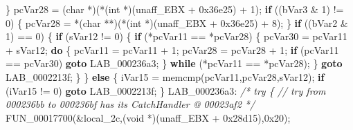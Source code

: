 \documentclass[
]{article}
\newenvironment{Shaded}{}{}
\newcommand{\BaseNTok}[1]{\textcolor[rgb]{0.25,0.63,0.44}{#1}}
\newcommand{\CommentTok}[1]{\textcolor[rgb]{0.38,0.63,0.69}{\textit{#1}}}
\newcommand{\ControlFlowTok}[1]{\textcolor[rgb]{0.00,0.44,0.13}{\textbf{#1}}}
\newcommand{\DataTypeTok}[1]{\textcolor[rgb]{0.56,0.13,0.00}{#1}}
\newcommand{\DecValTok}[1]{\textcolor[rgb]{0.25,0.63,0.44}{#1}}
\newcommand{\NormalTok}[1]{#1}
\newcommand{\OperatorTok}[1]{\textcolor[rgb]{0.40,0.40,0.40}{#1}}
\begin{document}
\begin{Shaded}
\begin{Highlighting}[]
    \OperatorTok{\}}
\NormalTok{    pcVar28 }\OperatorTok{=} \OperatorTok{(}\DataTypeTok{char} \OperatorTok{*)(*(}\DataTypeTok{int} \OperatorTok{*)(}\NormalTok{unaff\_EBX }\OperatorTok{+} \BaseNTok{0x36e25}\OperatorTok{)} \OperatorTok{+} \DecValTok{1}\OperatorTok{);}
    \ControlFlowTok{if} \OperatorTok{((}\NormalTok{bVar3 }\OperatorTok{\&} \DecValTok{1}\OperatorTok{)} \OperatorTok{!=} \DecValTok{0}\OperatorTok{)} \OperatorTok{\{}
\NormalTok{      pcVar28 }\OperatorTok{=} \OperatorTok{*(}\DataTypeTok{char} \OperatorTok{**)(*(}\DataTypeTok{int} \OperatorTok{*)(}\NormalTok{unaff\_EBX }\OperatorTok{+} \BaseNTok{0x36e25}\OperatorTok{)} \OperatorTok{+} \DecValTok{8}\OperatorTok{);}
    \OperatorTok{\}}
    \ControlFlowTok{if} \OperatorTok{((}\NormalTok{bVar2 }\OperatorTok{\&} \DecValTok{1}\OperatorTok{)} \OperatorTok{==} \DecValTok{0}\OperatorTok{)} \OperatorTok{\{}
      \ControlFlowTok{if} \OperatorTok{(}\NormalTok{sVar12 }\OperatorTok{!=} \DecValTok{0}\OperatorTok{)} \OperatorTok{\{}
        \ControlFlowTok{if} \OperatorTok{(*}\NormalTok{pcVar11 }\OperatorTok{==} \OperatorTok{*}\NormalTok{pcVar28}\OperatorTok{)} \OperatorTok{\{}
\NormalTok{          pcVar30 }\OperatorTok{=}\NormalTok{ pcVar11 }\OperatorTok{+}\NormalTok{ sVar12}\OperatorTok{;}
          \ControlFlowTok{do} \OperatorTok{\{}
\NormalTok{            pcVar11 }\OperatorTok{=}\NormalTok{ pcVar11 }\OperatorTok{+} \DecValTok{1}\OperatorTok{;}
\NormalTok{            pcVar28 }\OperatorTok{=}\NormalTok{ pcVar28 }\OperatorTok{+} \DecValTok{1}\OperatorTok{;}
            \ControlFlowTok{if} \OperatorTok{(}\NormalTok{pcVar11 }\OperatorTok{==}\NormalTok{ pcVar30}\OperatorTok{)} \ControlFlowTok{goto}\NormalTok{ LAB\_000236a3}\OperatorTok{;}
          \OperatorTok{\}} \ControlFlowTok{while} \OperatorTok{(*}\NormalTok{pcVar11 }\OperatorTok{==} \OperatorTok{*}\NormalTok{pcVar28}\OperatorTok{);}
        \OperatorTok{\}}
        \ControlFlowTok{goto}\NormalTok{ LAB\_0002213f}\OperatorTok{;}
      \OperatorTok{\}}
    \OperatorTok{\}}
    \ControlFlowTok{else} \OperatorTok{\{}
\NormalTok{      iVar15 }\OperatorTok{=}\NormalTok{ memcmp}\OperatorTok{(}\NormalTok{pcVar11}\OperatorTok{,}\NormalTok{pcVar28}\OperatorTok{,}\NormalTok{sVar12}\OperatorTok{);}
      \ControlFlowTok{if} \OperatorTok{(}\NormalTok{iVar15 }\OperatorTok{!=} \DecValTok{0}\OperatorTok{)} \ControlFlowTok{goto}\NormalTok{ LAB\_0002213f}\OperatorTok{;}
    \OperatorTok{\}}
\NormalTok{LAB\_000236a3}\OperatorTok{:}
                    \CommentTok{/* try \{ // try from 000236bb to 000236bf has its CatchHandler @ 00023af2 */}
\NormalTok{    FUN\_00017700}\OperatorTok{(\&}\NormalTok{local\_2c}\OperatorTok{,(}\DataTypeTok{void} \OperatorTok{*)(}\NormalTok{unaff\_EBX }\OperatorTok{+} \BaseNTok{0x28d15}\OperatorTok{),}\BaseNTok{0x20}\OperatorTok{);}

\end{Highlighting}
\end{Shaded}
\end{document}
